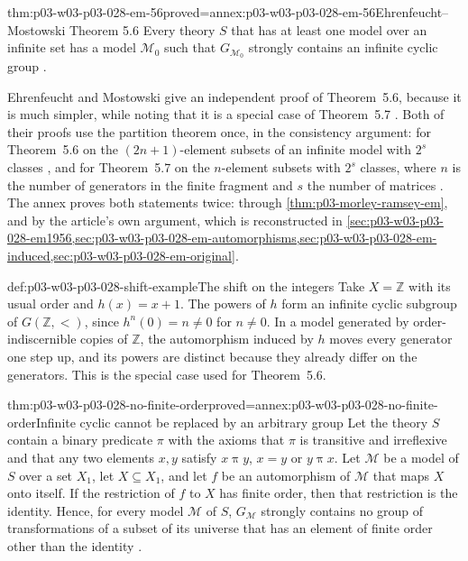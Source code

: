 \begin{hbcorollary}{thm:p03-w03-p03-028-em-56}{proved=annex:p03-w03-p03-028-em-56}{Ehrenfeucht--Mostowski Theorem 5.6}
Every theory \(S\) that has at least one model over an infinite set has a
model \(\mathcal M_0\) such that \(G_{\mathcal M_0}\) strongly contains an
infinite cyclic group \cite[Theorem~5.6, p.~60]{EhrenfeuchtMostowski1956}.
\end{hbcorollary}

Ehrenfeucht and Mostowski give an independent proof of Theorem~5.6, because
it is much simpler, while noting that it is a special case of Theorem~5.7
\cite[p.~60]{EhrenfeuchtMostowski1956}.  Both of their proofs use the
partition theorem once, in the consistency argument: for Theorem~5.6 on the
\((2n+1)\)-element subsets of an infinite model with \(2^s\) classes
\cite[p.~62]{EhrenfeuchtMostowski1956}, and for Theorem~5.7 on the
\(n\)-element subsets with \(2^s\) classes, where \(n\) is the number of
generators in the finite fragment and \(s\) the number of matrices
\cite[pp.~64--65]{EhrenfeuchtMostowski1956}.  The annex proves both
statements twice: through \cref{thm:p03-morley-ramsey-em}, and by the
article's own argument, which is reconstructed in
\cref{sec:p03-w03-p03-028-em1956,sec:p03-w03-p03-028-em-automorphisms,sec:p03-w03-p03-028-em-induced,sec:p03-w03-p03-028-em-original}.

\begin{hbexample}{def:p03-w03-p03-028-shift-example}{The shift on the integers}
Take \(X=\mathbb Z\) with its usual order and \(h(x)=x+1\).  The powers of
\(h\) form an infinite cyclic subgroup of \(G(\mathbb Z,<)\), since
\(h^n(0)=n\neq0\) for \(n\neq0\).  In a model generated by
order-indiscernible copies of \(\mathbb Z\), the automorphism induced by
\(h\) moves every generator one step up, and its powers are distinct
because they already differ on the generators.  This is the special case
used for Theorem~5.6.
\end{hbexample}

\begin{hbtheorem}{thm:p03-w03-p03-028-no-finite-order}{proved=annex:p03-w03-p03-028-no-finite-order}{Infinite cyclic cannot be replaced by an arbitrary group}
Let the theory \(S\) contain a binary predicate \(\pi\) with the axioms
that \(\pi\) is transitive and irreflexive and that any two elements
\(x,y\) satisfy \(x\mathrel\pi y\), \(x=y\) or \(y\mathrel\pi x\).  Let
\(\mathcal M\) be a model of \(S\) over a set \(X_1\), let
\(X\subseteq X_1\), and let \(f\) be an automorphism of \(\mathcal M\)
that maps \(X\) onto itself.  If the restriction of \(f\) to \(X\) has
finite order, then that restriction is the identity.  Hence, for every
model \(\mathcal M\) of \(S\), \(G_{\mathcal M}\) strongly contains no
group of transformations of a subset of its universe that has an element of
finite order other than the identity
\cite[pp.~62--63]{EhrenfeuchtMostowski1956}.
\end{hbtheorem}

